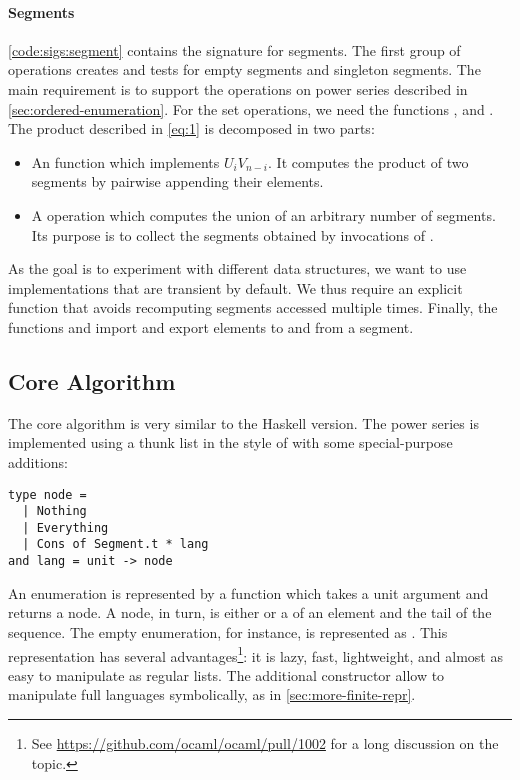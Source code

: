 \paragraph{Segments}

\autoref{code:sigs:segment} contains the signature for segments.
The first group of operations creates and tests for empty segments and
singleton segments. 
The main requirement is to support the operations on power series described in
\autoref{sec:ordered-enumeration}.
For the set operations, we need the functions
,  and .
%
The product described in \autoref{eq:1} is decomposed in two parts:
\begin{itemize}[leftmargin=*]
\item An  function which implements $U_i V_{n-i}$. It computes the
  product of two segments by pairwise appending their elements.
\item A  operation which computes the union of an arbitrary number
  of segments. Its purpose is to collect the segments obtained
  by invocations of .
\end{itemize}
%
As the goal is to experiment with different data structures, we want
to use implementations that are transient by default. We thus require 
an explicit  function that avoids recomputing segments accessed
multiple times. 
%
Finally, the functions   and  import and
export elements to and from a segment.

\subsection{Core Algorithm}

The core algorithm is very similar to the Haskell version. The power series
is implemented using a thunk list in the style of \citet{DBLP:conf/cpp/Pottier17}
with some special-purpose additions:

\begin{lstlisting}
type node =
  | Nothing
  | Everything
  | Cons of Segment.t * lang
and lang = unit -> node
\end{lstlisting}

An enumeration is represented by a function which takes a unit argument and returns
a node. A node, in turn, is either  or a  of an
element and the tail of the sequence. The empty enumeration, for instance, is
represented as .
This representation has several advantages\footnote{See
  \url{https://github.com/ocaml/ocaml/pull/1002} for a long discussion
  on the topic.}: it is lazy, fast, lightweight, and almost as easy to
manipulate as regular lists.
The additional constructor  allow to manipulate
full languages symbolically, as in \cref{sec:more-finite-repr}.

